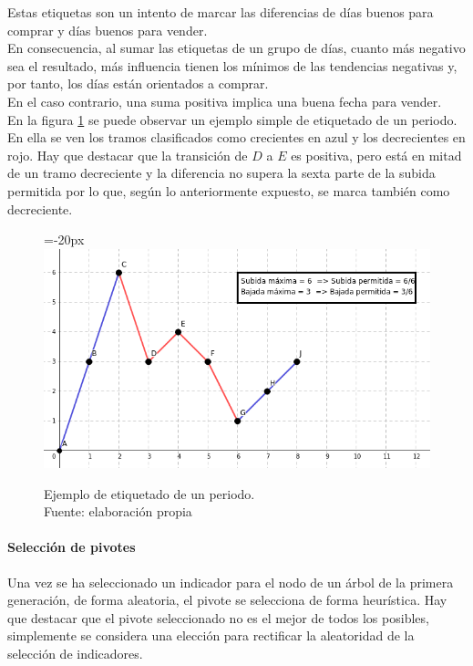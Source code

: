     Estas etiquetas son un intento de marcar las diferencias de d\'ias buenos para comprar y d\'ias buenos para vender. \\
    
    En consecuencia, al sumar las etiquetas de un grupo de d\'ias, cuanto m\'as negativo sea el resultado, m\'as influencia tienen los m\'inimos de las tendencias negativas y, por tanto, los d\'ias est\'an orientados a comprar.\\
    
    En el caso contrario, una suma positiva implica una buena fecha para vender.\\
    
    En la figura \ref{fig:tagging} se puede observar un ejemplo simple de etiquetado de un periodo. En ella se ven los tramos clasificados como crecientes en azul y los decrecientes en rojo. Hay que destacar que la transici\'on de $D$ a $E$ es positiva, pero est\'a en mitad de un tramo decreciente y la diferencia no supera la sexta parte de la subida permitida por lo que, seg\'un lo anteriormente expuesto, se marca tambi\'en como decreciente.\\
    
     	\begin{figure}[H]
    		\centering\leftskip=-20px
    		\includegraphics[scale=0.65]{imagenes/tagging.png}
    	    \caption[Ejemplo de etiquetado de un periodo]{Ejemplo de etiquetado de un periodo.\\ Fuente: elaboraci\'on propia}
    		\label{fig:tagging}
	   \end{figure}
    
\paragraph{Selecci\'on de pivotes}
Una vez se ha seleccionado un indicador para el nodo de un \'arbol de la primera generaci\'on, de forma aleatoria, el pivote se selecciona de forma heur\'istica. Hay que destacar que el pivote seleccionado no es el mejor de todos los posibles, simplemente se considera una elecci\'on para rectificar la aleatoridad de la selecci\'on de indicadores.\\

